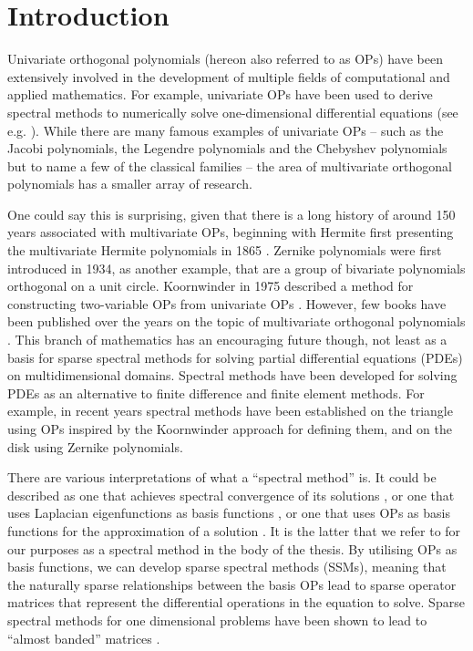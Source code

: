 
\chapter{Introduction}

Univariate orthogonal polynomials (hereon also referred to as OPs) have been extensively involved in the development of multiple fields of computational and applied mathematics. For example, univariate OPs have been used to derive spectral methods to numerically solve one-dimensional differential equations (see e.g. \cite{trefethen2000spectral, canuto2007spectral, gottlieb1977numerical, boyd2001chebyshev, mason2002chebyshev, shen2011spectral, olver2013fast}). While there are many famous examples of univariate OPs -- such as the Jacobi polynomials, the Legendre polynomials and the Chebyshev polynomials but to name a few of the classical families \cite[\S18.3]{DLMF} -- the area of multivariate orthogonal polynomials has a smaller array of research. 

One could say this is surprising, given that there is a long history of around 150 years associated with multivariate OPs, beginning with Hermite first presenting the multivariate Hermite polynomials in 1865 \cite{appel1926fonctions, ismail2017review}. Zernike polynomials \cite{zernike1934diffraction} were first introduced in 1934, as another example, that are a group of bivariate polynomials orthogonal on a unit circle. Koornwinder in 1975 described a method for constructing two-variable OPs from univariate OPs \cite{koornwinder1975two}. However, few books have been published over the years on the topic of multivariate orthogonal polynomials \cite{dunkl2014orthogonal}. This branch of mathematics has an encouraging future though, not least as a basis for sparse spectral methods for solving partial differential equations (PDEs) on multidimensional domains. Spectral methods have been developed for solving PDEs as an alternative to finite difference and finite element methods. For example, in recent years spectral methods have been established on the triangle \cite{olver2019triangle} using OPs inspired by the Koornwinder approach for defining them, and on the disk \cite{vasil2016tensor} using Zernike polynomials.

There are various interpretations of what a \enquote{spectral method} is. It could be described as one that achieves spectral convergence of its solutions \cite{gottlieb1977numerical}, or one that uses Laplacian eigenfunctions as basis functions \cite{zhong2007numerical}, or one that uses OPs as basis functions for the approximation of a solution \cite{olver2019triangle}. It is the latter that we refer to for our purposes as a spectral method in the body of the thesis. By utilising OPs as basis functions, we can develop sparse spectral methods (SSMs), meaning that the naturally sparse relationships between the basis OPs lead to sparse operator matrices that represent the differential operations in the equation to solve. Sparse spectral methods for one dimensional problems have been shown to lead to \enquote{almost banded} matrices \cite{olver2013fast}.

